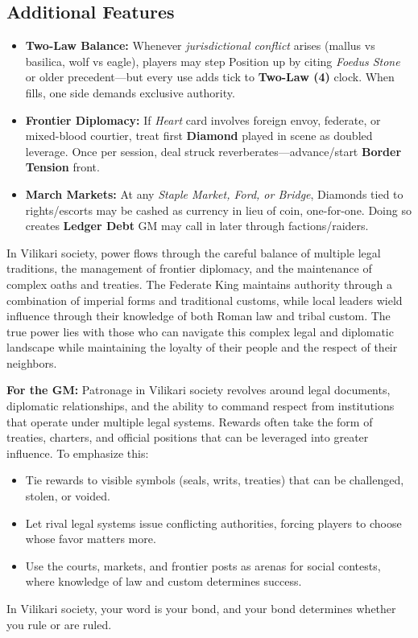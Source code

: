 \subsection*{Additional Features}
\begin{itemize}
\item \textbf{Two-Law Balance:} Whenever \emph{jurisdictional conflict} arises (mallus vs basilica, wolf vs eagle), players may step Position up by citing \emph{Foedus Stone} or older precedent—but every use adds tick to \textbf{Two-Law (4)} clock. When fills, one side demands exclusive authority.
\item \textbf{Frontier Diplomacy:} If \emph{Heart} card involves foreign envoy, federate, or mixed-blood courtier, treat first \textbf{Diamond} played in scene as doubled leverage. Once per session, deal struck reverberates—advance/start \textbf{Border Tension} front.
\item \textbf{March Markets:} At any \emph{Staple Market, Ford, or Bridge}, Diamonds tied to rights/escorts may be cashed as currency in lieu of coin, one-for-one. Doing so creates \textbf{Ledger Debt} GM may call in later through factions/raiders.
\end{itemize}

\begin{tcolorbox}[colback=black!3,colframe=black!40!white,title={Patronage \& Power}]
In Vilikari society, power flows through the careful balance of multiple legal traditions, the management of frontier diplomacy, and the maintenance of complex oaths and treaties. The Federate King maintains authority through a combination of imperial forms and traditional customs, while local leaders wield influence through their knowledge of both Roman law and tribal custom. The true power lies with those who can navigate this complex legal and diplomatic landscape while maintaining the loyalty of their people and the respect of their neighbors.

\textbf{For the GM:}  
Patronage in Vilikari society revolves around legal documents, diplomatic relationships, and the ability to command respect from institutions that operate under multiple legal systems. Rewards often take the form of treaties, charters, and official positions that can be leveraged into greater influence. To emphasize this:
\begin{itemize}
\item Tie rewards to visible symbols (seals, writs, treaties) that can be challenged, stolen, or voided.
\item Let rival legal systems issue conflicting authorities, forcing players to choose whose favor matters more.
\item Use the courts, markets, and frontier posts as arenas for social contests, where knowledge of law and custom determines success.
\end{itemize}
In Vilikari society, your word is your bond, and your bond determines whether you rule or are ruled.
\end{tcolorbox}

